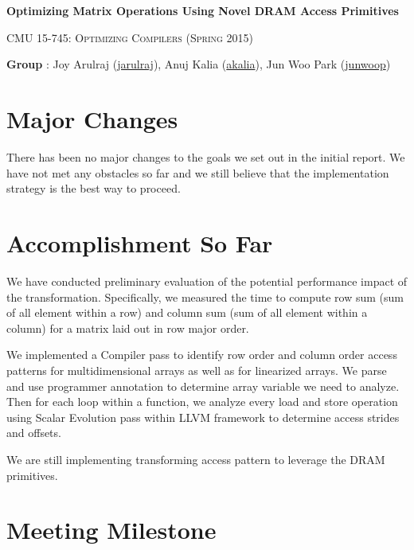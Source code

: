 \documentclass[letterpaper]{article}
\makeatletter
\newcommand{\email}[1]{\href{mailto:#1@cs.cmu.edu}{#1}}
\makeatother
\begin{document}
\section*{}
\begin{center}
  \centerline{\textbf{\Large Optimizing Matrix Operations Using Novel DRAM
  Access Primitives}}
  \vspace{1em}
  \textsc{\large CMU 15-745: Optimizing Compilers (Spring 2015)} \\
  \vspace{3em}
  \centerline{\large{\textbf{Group} : Joy Arulraj (\email{jarulraj}), Anuj Kalia
  (\email{akalia})}, Jun Woo Park (\email{junwoop}) }
  \vspace{1em}
\end{center}

\section{Major Changes}

There has been no major changes to the goals we set out in the initial report. We have not met any obstacles so far and we still believe that the implementation strategy is the best way to proceed. 

\section{Accomplishment So Far}

We have conducted preliminary evaluation of the potential performance impact of the transformation. Specifically, we measured the time to compute row sum (sum of all element within a row) and column sum (sum of all element within a column) for a matrix laid out in row major order. 

We implemented a Compiler pass to identify row order and column order access patterns for multidimensional arrays as well as for linearized arrays. We parse and use programmer annotation to determine array variable we need to analyze. Then for each loop within a function, we analyze every load and store operation using Scalar Evolution pass within LLVM framework to determine access strides and offsets. 

We are still implementing transforming access pattern to leverage the DRAM primitives. 

\section{Meeting Milestone}
\end{document}
